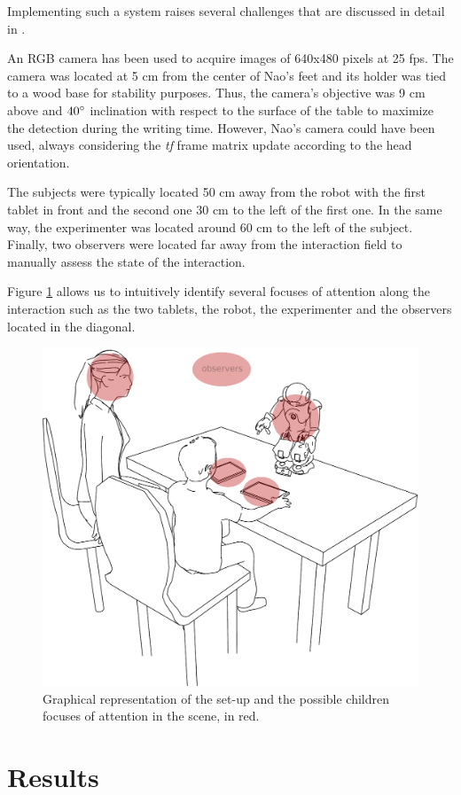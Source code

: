 \documentclass{sig-alternate}
\begin{document}
Implementing such a system raises several challenges that are discussed in detail in \cite{Hood:2015}.

An RGB camera has been used to acquire images of 640x480 pixels at 25 fps. The camera was located at 5 cm from the center of Nao's feet and its holder was tied to a wood base for stability purposes. Thus, the camera's objective was 9 cm above and $ 40\degree $ inclination with respect to the surface of the table to maximize the detection during the writing time. However, Nao's camera could have been used, always considering the \textit{tf} frame matrix update according to the head orientation.

The subjects were typically located 50 cm away from the robot with the first tablet in front and the second one 30 cm to the left of the first one. In the same way, the experimenter was located around 60 cm to the left of the subject. Finally, two observers were located far away from the interaction field to manually assess the state of the interaction.

Figure \ref{drawSetup} allows us to intuitively identify several focuses of attention along the interaction such as the two tablets, the robot, the experimenter and the observers located in the diagonal.

\begin{figure}[h!]
    \centering
    \includegraphics[width=0.7\columnwidth]{drawSetup}
    \caption{\small Graphical representation of the set-up and the possible children focuses of attention in the scene, in red.}
    \label{drawSetup}
\end{figure}


\section{Results}
\end{document}
